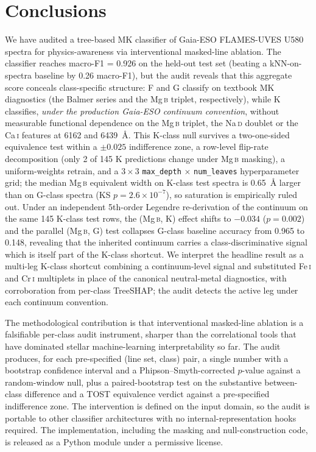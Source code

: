 \documentclass[11pt,a4paper]{article}
\newcommand{\Mgb}{Mg\,\textsc{b}\xspace}
\newcommand{\NaD}{Na\,\textsc{d}\xspace}
\newcommand{\CaI}{Ca\,\textsc{i}\xspace}
\newcommand{\FeI}{Fe\,\textsc{i}\xspace}
\newcommand{\CrI}{Cr\,\textsc{i}\xspace}
\begin{document}
\section{Conclusions}
\label{sec:conclusions}

We have audited a tree-based MK classifier of Gaia-ESO FLAMES-UVES U580 spectra for physics-awareness via interventional masked-line ablation. The classifier reaches macro-F1 = 0.926 on the held-out test set (beating a kNN-on-spectra baseline by 0.26 macro-F1), but the audit reveals that this aggregate score conceals class-specific structure: F and G classify on textbook MK diagnostics (the Balmer series and the \Mgb triplet, respectively), while K classifies, \emph{under the production Gaia-ESO continuum convention}, without measurable functional dependence on the \Mgb triplet, the \NaD doublet or the \CaI features at 6162 and 6439~\AA{}. This K-class null survives a two-one-sided equivalence test within a $\pm 0.025$ indifference zone, a row-level flip-rate decomposition (only 2 of 145 K predictions change under \Mgb masking), a uniform-weights retrain, and a $3 \times 3$ \texttt{max\_depth} $\times$ \texttt{num\_leaves} hyperparameter grid; the median \Mgb equivalent width on K-class test spectra is 0.65~\AA{} larger than on G-class spectra (KS $p = 2.6 \times 10^{-7}$), so saturation is empirically ruled out. Under an independent 5th-order Legendre re-derivation of the continuum on the same 145 K-class test rows, the (\Mgb, K) effect shifts to $-0.034$ ($p = 0.002$) and the parallel (\Mgb, G) test collapses G-class baseline accuracy from 0.965 to 0.148, revealing that the inherited continuum carries a class-discriminative signal which is itself part of the K-class shortcut. We interpret the headline result as a multi-leg K-class shortcut combining a continuum-level signal and substituted \FeI and \CrI multiplets in place of the canonical neutral-metal diagnostics, with corroboration from per-class TreeSHAP; the audit detects the active leg under each continuum convention.

The methodological contribution is that interventional masked-line ablation is a falsifiable per-class audit instrument, sharper than the correlational tools that have dominated stellar machine-learning interpretability so far. The audit produces, for each pre-specified (line set, class) pair, a single number with a bootstrap confidence interval and a Phipson--Smyth-corrected $p$-value against a random-window null, plus a paired-bootstrap test on the substantive between-class difference and a TOST equivalence verdict against a pre-specified indifference zone. The intervention is defined on the input domain, so the audit is portable to other classifier architectures with no internal-representation hooks required. The implementation, including the masking and null-construction code, is released as a Python module under a permissive license.
\end{document}
